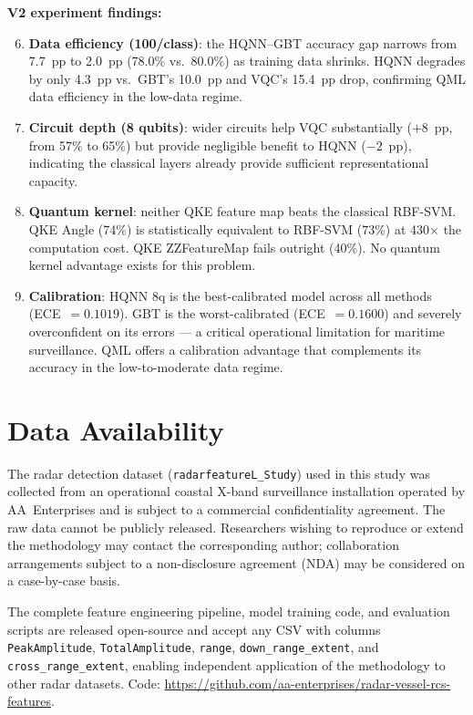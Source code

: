 \documentclass[journal]{IEEEtran}
\begin{document}
\noindent\textbf{V2 experiment findings:}
\begin{enumerate}
  \setcounter{enumi}{5}
  \item \textbf{Data efficiency (100/class)}: the HQNN--GBT accuracy gap narrows
        from 7.7~pp to 2.0~pp (78.0\% vs.\ 80.0\%) as training data shrinks.
        HQNN degrades by only 4.3~pp vs.\ GBT's 10.0~pp and VQC's 15.4~pp
        drop, confirming QML data efficiency in the low-data regime.
  \item \textbf{Circuit depth (8 qubits)}: wider circuits help VQC substantially
        ($+8$~pp, from 57\% to 65\%) but provide negligible benefit to HQNN
        ($-2$~pp), indicating the classical layers already provide sufficient
        representational capacity.
  \item \textbf{Quantum kernel}: neither QKE feature map beats the classical
        RBF-SVM. QKE Angle (74\%) is statistically equivalent to RBF-SVM (73\%)
        at 430$\times$ the computation cost. QKE ZZFeatureMap fails outright
        (40\%). No quantum kernel advantage exists for this problem.
  \item \textbf{Calibration}: HQNN 8q is the best-calibrated model across all
        methods (ECE~$= 0.1019$). GBT is the worst-calibrated (ECE~$= 0.1600$)
        and severely overconfident on its errors — a critical operational
        limitation for maritime surveillance. QML offers a calibration advantage
        that complements its accuracy in the low-to-moderate data regime.
\end{enumerate}

\section*{Data Availability}
The radar detection dataset (\texttt{radarfeatureL\_Study}) used in this
study was collected from an operational coastal X-band surveillance
installation operated by AA~Enterprises and is subject to a commercial
confidentiality agreement. The raw data cannot be publicly released.
Researchers wishing to reproduce or extend the methodology may contact
the corresponding author; collaboration arrangements subject to a
non-disclosure agreement (NDA) may be considered on a case-by-case basis.

The complete feature engineering pipeline, model training code, and
evaluation scripts are released open-source and accept any CSV with
columns \texttt{PeakAmplitude}, \texttt{TotalAmplitude}, \texttt{range},
\texttt{down\_range\_extent}, and \texttt{cross\_range\_extent}, enabling
independent application of the methodology to other radar datasets.
Code: \url{https://github.com/aa-enterprises/radar-vessel-rcs-features}.
\end{document}
